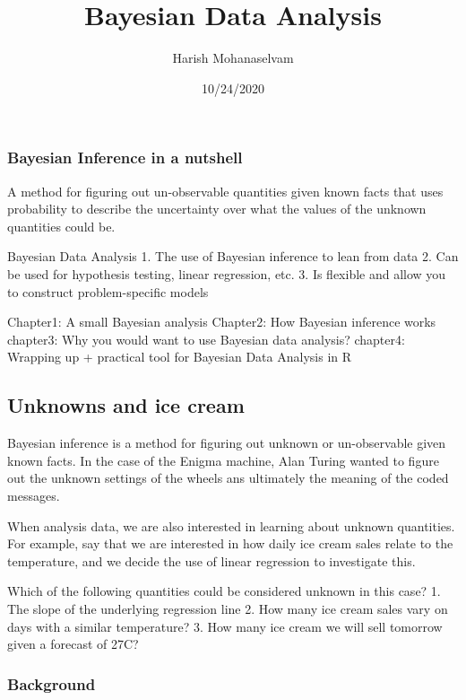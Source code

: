 \documentclass[
]{article}
\title{Bayesian Data Analysis}
\author{Harish Mohanaselvam}
\date{10/24/2020}
\begin{document}
\maketitle

\hypertarget{bayesian-inference-in-a-nutshell}{%
\subsubsection{Bayesian Inference in a
nutshell}\label{bayesian-inference-in-a-nutshell}}

A method for figuring out un-observable quantities given known facts
that uses probability to describe the uncertainty over what the values
of the unknown quantities could be.

Bayesian Data Analysis 1. The use of Bayesian inference to lean from
data 2. Can be used for hypothesis testing, linear regression, etc. 3.
Is flexible and allow you to construct problem-specific models

Chapter1: A small Bayesian analysis Chapter2: How Bayesian inference
works chapter3: Why you would want to use Bayesian data analysis?
chapter4: Wrapping up + practical tool for Bayesian Data Analysis in R

\hypertarget{unknowns-and-ice-cream}{%
\subsection{Unknowns and ice cream}\label{unknowns-and-ice-cream}}

Bayesian inference is a method for figuring out unknown or un-observable
given known facts. In the case of the Enigma machine, Alan Turing wanted
to figure out the unknown settings of the wheels ans ultimately the
meaning of the coded messages.

When analysis data, we are also interested in learning about unknown
quantities. For example, say that we are interested in how daily ice
cream sales relate to the temperature, and we decide the use of linear
regression to investigate this.

Which of the following quantities could be considered unknown in this
case? 1. The slope of the underlying regression line 2. How many ice
cream sales vary on days with a similar temperature? 3. How many ice
cream we will sell tomorrow given a forecast of 27C?

\hypertarget{background}{%
\subsubsection{Background}\label{background}}
\end{document}
